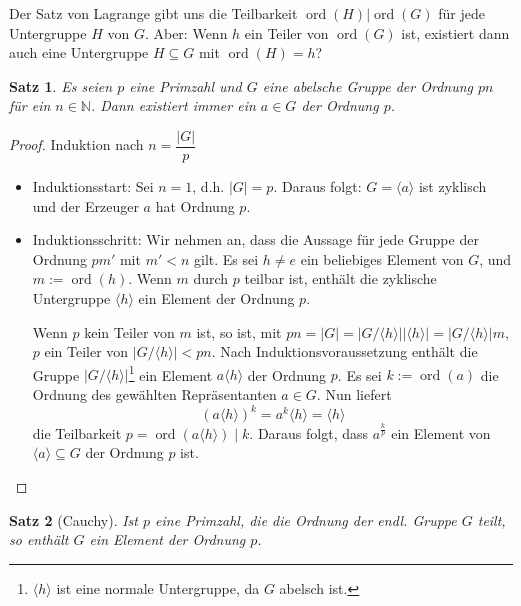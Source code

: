 \documentclass[12pt]{scrartcl} %
\DeclareMathOperator{\ord}{ord}
\newtheorem{thm}{Satz}
\theoremstyle{definition}
\theoremstyle{remark}
\begin{document}
Der Satz von Lagrange gibt uns die Teilbarkeit $\ord(H)|\ord(G)$ für jede Untergruppe $H$ von $G$.
Aber: Wenn \(h\) ein Teiler von $\ord(G)$ ist, existiert dann auch eine Untergruppe \(H \subseteq G\) mit $\ord(H)=h$?

\begin{thm}
	Es seien $p$ eine Primzahl und $G$ eine abelsche Gruppe der Ordnung $pn$ für ein $n\in\mathbb{N}$.
	Dann existiert immer ein $a \in G$ der Ordnung $p$.
\end{thm}

\begin{proof}
	Induktion nach $n=\dfrac{|G|}{p}$
	\begin{itemize}
	\item Induktionsstart: Sei \(n=1\), d.h. $|G|=p$.
		Daraus folgt: $G=\langle a\rangle$ ist zyklisch und der Erzeuger \(a\) hat Ordnung \(p\).
	\item Induktionsschritt: Wir nehmen an, dass die Aussage für jede Gruppe der Ordnung $pm'$ mit $m'<n$ gilt.
		Es sei $h\neq e$ ein beliebiges Element von \(G\), und $m:=\ord(h)$.
		Wenn \(m\) durch \(p\) teilbar ist, enthält die zyklische Untergruppe $\langle h\rangle$ ein Element der Ordnung \(p\).

		Wenn \(p\) kein Teiler von \(m\) ist, so ist, mit \(pn = |G| = |G/\langle h\rangle||\langle h\rangle| = |G/\langle h\rangle|m\), \(p\) ein Teiler von $|G/\langle h\rangle|<pn$.
		Nach Induktionsvoraussetzung enthält die Gruppe $|G/\langle h\rangle|$\footnote{\(\langle h\rangle\) ist eine normale Untergruppe, da \(G\) abelsch ist.} ein Element $a\langle h\rangle$ der Ordnung \(p\).
		Es sei $k:=\ord(a)$ die Ordnung des gewählten Repräsentanten $a \in G$.
		Nun liefert \[(a\langle h\rangle)^k=a^k\langle h\rangle=\langle h\rangle\] die Teilbarkeit \(p = \ord(a\langle h\rangle) \mid k\).
		Daraus folgt, dass $a^{\frac{k}{p}}$ ein Element von $\langle a\rangle \subseteq G$ der Ordnung \(p\) ist.\qedhere
	\end{itemize}
\end{proof}

\begin{thm}[Cauchy]
	Ist \(p\) eine Primzahl, die die Ordnung der endl. Gruppe \(G\) teilt, so enthält \(G\) ein Element der Ordnung \(p\).
\end{thm}
\end{document}
